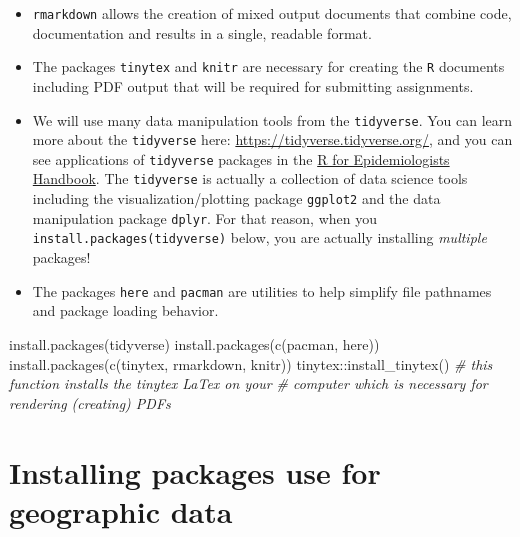 \documentclass[
]{book}
\newenvironment{Shaded}{\begin{snugshade}}{\end{snugshade}}
\newcommand{\CommentTok}[1]{\textcolor[rgb]{0.56,0.35,0.01}{\textit{#1}}}
\newcommand{\FunctionTok}[1]{\textcolor[rgb]{0.00,0.00,0.00}{#1}}
\newcommand{\NormalTok}[1]{#1}
\newcommand{\SpecialCharTok}[1]{\textcolor[rgb]{0.00,0.00,0.00}{#1}}
\newcommand{\StringTok}[1]{\textcolor[rgb]{0.31,0.60,0.02}{#1}}
\providecommand{\tightlist}{%
  \setlength{\itemsep}{0pt}\setlength{\parskip}{0pt}}
\begin{document}
\begin{itemize}
\tightlist
\item
  \texttt{rmarkdown} allows the creation of mixed output documents that combine code, documentation and results in a single, readable format.
\item
  The packages \texttt{tinytex} and \texttt{knitr} are necessary for creating the \texttt{R} documents including PDF output that will be required for submitting assignments.
\item
  We will use many data manipulation tools from the \texttt{tidyverse}. You can learn more about the \texttt{tidyverse} here: \url{https://tidyverse.tidyverse.org/}, and you can see applications of \texttt{tidyverse} packages in the \href{https://epirhandbook.com/index.html}{R for Epidemiologists Handbook}. The \texttt{tidyverse} is actually a collection of data science tools including the visualization/plotting package \texttt{ggplot2} and the data manipulation package \texttt{dplyr}. For that reason, when you \texttt{install.packages(\textquotesingle{}tidyverse\textquotesingle{})} below, you are actually installing \emph{multiple} packages!
\item
  The packages \texttt{here} and \texttt{pacman} are utilities to help simplify file pathnames and package loading behavior.
\end{itemize}

\begin{Shaded}
\begin{Highlighting}[]
\FunctionTok{install.packages}\NormalTok{(}\StringTok{\textquotesingle{}tidyverse\textquotesingle{}}\NormalTok{)   }
\FunctionTok{install.packages}\NormalTok{(}\FunctionTok{c}\NormalTok{(}\StringTok{\textquotesingle{}pacman\textquotesingle{}}\NormalTok{, }\StringTok{\textquotesingle{}here\textquotesingle{}}\NormalTok{))}
\FunctionTok{install.packages}\NormalTok{(}\FunctionTok{c}\NormalTok{(}\StringTok{\textquotesingle{}tinytex\textquotesingle{}}\NormalTok{, }\StringTok{\textquotesingle{}rmarkdown\textquotesingle{}}\NormalTok{, }\StringTok{\textquotesingle{}knitr\textquotesingle{}}\NormalTok{)) }
\NormalTok{tinytex}\SpecialCharTok{::}\FunctionTok{install\_tinytex}\NormalTok{()  }
\CommentTok{\# this function installs the tinytex LaTex on your}
\CommentTok{\#  computer which is necessary for rendering (creating) PDF\textquotesingle{}s }
\end{Highlighting}
\end{Shaded}

\hypertarget{installing-packages-use-for-geographic-data}{%
\section*{Installing packages use for geographic data}\label{installing-packages-use-for-geographic-data}}
\end{document}
